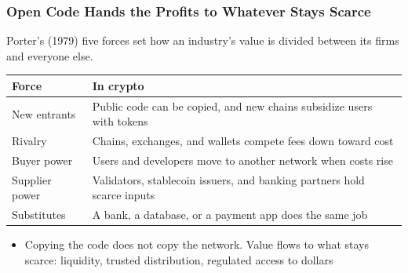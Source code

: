 \documentclass[aspectratio=169]{beamer}
\newcommand{\bi}{\begin{itemize}}
\newcommand{\ei}{\end{itemize}}
\newcommand{\m}{\item}
\begin{document}
\begin{frame}[label=appx-fiveforces]
\frametitle{Open Code Hands the Profits to Whatever Stays Scarce}

{\small Porter's (1979) five forces set how an industry's value is divided between its firms and everyone else.}
\vspace{1mm}
\begin{center}
\small
\begin{tabular}{p{} p{}}
\toprule
\textbf{Force} & \textbf{In crypto} \\
\midrule
New entrants & Public code can be copied, and new chains subsidize users with tokens \\
Rivalry & Chains, exchanges, and wallets compete fees down toward cost \\
Buyer power & Users and developers move to another network when costs rise \\
Supplier power & Validators, stablecoin issuers, and banking partners hold scarce inputs \\
Substitutes & A bank, a database, or a payment app does the same job \\
\bottomrule
\end{tabular}
\end{center}

\bi
\m Copying the code does not copy the network. Value flows to what stays scarce: liquidity, trusted distribution, regulated access to dollars
\ei
\par\vspace{0pt plus 1fill}\hfill{\scriptsize \hyperlink{main-problems}{}}
\end{frame}
\end{document}
